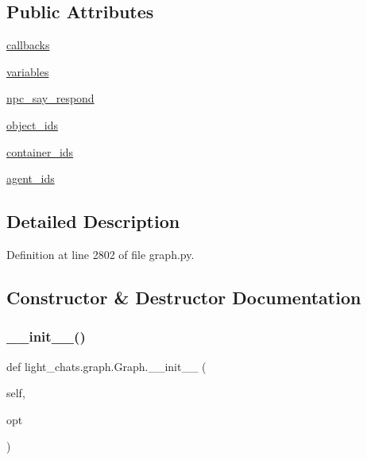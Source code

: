 \subsection*{Public Attributes}
\begin{DoxyCompactItemize}
\item 
\hyperlink{classlight__chats_1_1graph_1_1Graph_a95a1a4d31dbd607eebd593579b2d6cdd}{callbacks}
\item 
\hyperlink{classlight__chats_1_1graph_1_1Graph_a29a00f3191fb45f73bd784ed12cc2c2e}{variables}
\item 
\hyperlink{classlight__chats_1_1graph_1_1Graph_ad461dca41746ab79ffdaf70f6a9b25c4}{npc\+\_\+say\+\_\+respond}
\item 
\hyperlink{classlight__chats_1_1graph_1_1Graph_a8ac9ab3b5c6208e0df9b28d436c7c425}{object\+\_\+ids}
\item 
\hyperlink{classlight__chats_1_1graph_1_1Graph_a79bd1a69e214458644ecf74d218e476c}{container\+\_\+ids}
\item 
\hyperlink{classlight__chats_1_1graph_1_1Graph_a2bd5d1191b6a64402e7bb1f992516265}{agent\+\_\+ids}
\end{DoxyCompactItemize}


\subsection{Detailed Description}


Definition at line 2802 of file graph.\+py.



\subsection{Constructor \& Destructor Documentation}
\mbox{\label{classlight__chats_1_1graph_1_1Graph_a5bd7cc4e21edc98dcbbac1040f68c878}} 
\subsubsection{\texorpdfstring{\+\_\+\+\_\+init\+\_\+\+\_\+()}{\_\_init\_\_()}}
{\footnotesize\ttfamily def light\+\_\+chats.\+graph.\+Graph.\+\_\+\+\_\+init\+\_\+\+\_\+ (\begin{DoxyParamCaption}\item[{}]{self,  }\item[{}]{opt }\end{DoxyParamCaption})}

